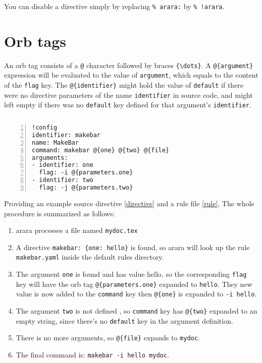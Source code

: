 \documentclass[a4paper]{article}
\begin{document}
You can disable a directive simply by replacing \verb|% arara:| by \verb|% !arara|.
\section{Orb tags}
An orb tag consists of a \verb|@| character followed by braces \verb|{\dots}|. A \verb|@{argument}| expression will be evaluated to the value of \verb|argument|, which equals to the content of the \verb|flag| key.
The \verb|@{identifier}| might hold the value of \verb|default| if there were no directive parameters of the name \verb|identifier| in source code, and might left empty if there was no \verb|default| key defined for that argument's \verb|identifier|.

\begin{lstlisting}[caption=directive in source file,label=directive]
% arara: makebar: { one: hello }
\end{lstlisting}
\begin{lstlisting}[numbers=left,caption=rule file,label=rule]
!config
identifier: makebar
name: MakeBar
command: makebar @{one} @{two} @{file}
arguments:
- identifier: one
  flag: -i @{parameters.one}
- identifier: two
  flag: -j @{parameters.two}
\end{lstlisting}
Providing an example source directive \ref{directive} and a rule file \ref{rule}, The whole procedure is summarized as follows:
\begin{enumerate}
  \item arara processes a file named \verb|mydoc.tex|
  \item A directive \verb|makebar: {one: hello}| is found, so arara will look up the rule 
    \verb|makebar.yaml| inside the default rules directory.
  \item The argument \verb|one| is found and has value hello, so the corresponding \verb|flag| key will have the orb tag \verb|@{parameters.one}| expanded to \verb|hello|. They new value is now added to the \verb|command| key then \verb|@{one}| is expanded to \verb|-i hello|.
  \item The argument \verb|two| is not defined , so \verb|command| key has \verb|@{two}| expanded to an empty string, since there's no \verb|default| key in the argument definition.
  \item There is no more arguments, so \verb|@{file}| expands to \verb|mydoc|.
  \item The final command is: \verb|makebar -i hello mydoc|.
\end{enumerate}
\end{document}
